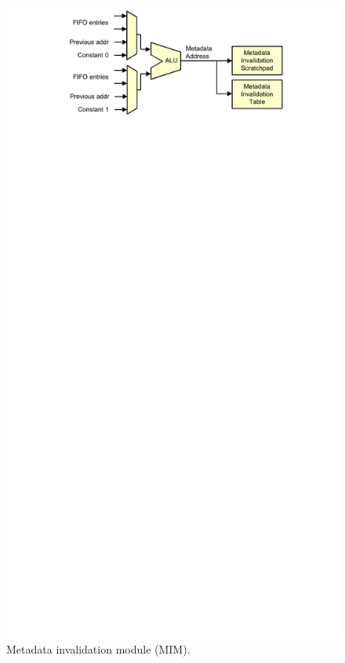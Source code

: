 \begin{figure}
  \begin{center}
    \includegraphics{monitoring_hard_drop/figs/mim.pdf}
    \caption{Metadata invalidation module (MIM).}
    \label{fig:monitoring_hard_drop.hwdrop.mim}
  \end{center}
\end{figure}

